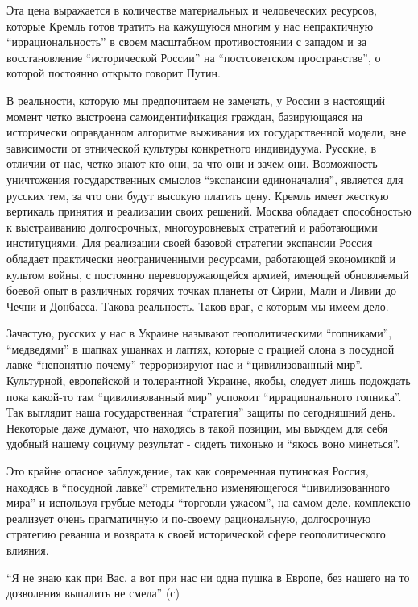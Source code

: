 Эта цена выражается в количестве материальных и человеческих ресурсов, которые
Кремль готов тратить на кажущуюся многим у нас непрактичную \enquote{иррациональность}
в своем масштабном противостоянии с западом и за восстановление \enquote{исторической
России} на \enquote{постсоветском пространстве}, о которой постоянно открыто говорит
Путин.

В реальности, которую мы предпочитаем не замечать, у России в настоящий момент
четко выстроена самоидентификация граждан, базирующаяся на исторически
оправданном алгоритме выживания их государственной модели, вне зависимости от
этнической культуры конкретного индивидуума. Русские, в отличии от нас, четко
знают кто они, за что они и зачем они. Возможность уничтожения государственных
смыслов \enquote{экспансии единоначалия}, является для русских тем, за что они будут
высокую платить цену. Кремль имеет жесткую вертикаль принятия и реализации
своих решений. Москва обладает способностью к выстраиванию долгосрочных,
многоуровневых стратегий и работающими институциями. Для реализации своей
базовой стратегии экспансии Россия обладает практически неограниченными
ресурсами, работающей экономикой и культом войны, с постоянно перевооружающейся
армией, имеющей обновляемый боевой опыт в различных горячих точках планеты от
Сирии, Мали и Ливии до Чечни и Донбасса. Такова реальность. Таков враг, с
которым мы имеем дело.

Зачастую, русских у нас в Украине называют геополитическими \enquote{гопниками},
\enquote{медведями} в шапках ушанках и лаптях, которые с грацией слона в посудной лавке
\enquote{непонятно почему} терроризируют нас и \enquote{цивилизованный мир}. Культурной,
европейской и толерантной Украине, якобы, следует лишь подождать пока какой-то
там \enquote{цивилизованный мир} успокоит \enquote{иррационального гопника}. Так выглядит наша
государственная \enquote{стратегия} защиты по сегодняшний день. Некоторые даже думают,
что находясь в такой позиции, мы выждем для себя удобный нашему социуму
результат - сидеть тихонько и \enquote{якось воно минеться}.

Это крайне опасное заблуждение, так как современная путинская Россия, находясь
в \enquote{посудной лавке} стремительно изменяющегося \enquote{цивилизованного мира} и
используя грубые методы \enquote{торговли ужасом}, на самом деле, комплексно реализует
очень прагматичную и по-своему рациональную, долгосрочную стратегию реванша и
возврата к своей исторической сфере геополитического влияния.

\enquote{Я не знаю как при Вас, а вот при нас ни одна пушка в Европе, без нашего на то
дозволения выпалить не смела} (с)

